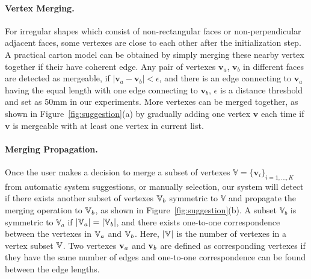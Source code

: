 \paragraph{Vertex Merging.} 
For irregular shapes which consist of non-rectangular faces or non-perpendicular adjacent faces, some vertexes are close to each other after the initialization step.
A practical carton model can be obtained by simply merging these nearby vertex together if their have coherent edge.
%
Any pair of vertexes $\mathbf{v}_a$, $\mathbf{v}_b$ in different faces are detected as mergeable, if $|\mathbf{v}_a-\mathbf{v}_b|<\epsilon$, and there is an edge connecting to $\mathbf{v}_a$ having the equal length with one edge connecting to $\mathbf{v}_b$,
%
$\epsilon$ is a distance threshold and set as 50mm in our experiments.
More vertexes can be merged together, as shown in Figure~\ref{fig:suggestion}(a) by gradually adding one vertex $\mathbf{v}$ each time if $\mathbf{v}$ is mergeable with at least one vertex in current list. 

\paragraph{Merging Propagation.} %
Once the user makes a decision to merge a subset of vertexes $\mathbb{V}=\{\mathbf{v}_i\}_{i=1,\ldots,K}$ from automatic system suggestions, or manually selection, our system will detect if there exists another subset of vertexes $\mathbb{V}_b$ symmetric to $\mathbb{V}$ and propagate the merging operation to $\mathbb{V}_b$, as shown in Figure~\ref{fig:suggestion}(b). 
A subset $\mathbb{V}_b$ is symmetric to $\mathbb{V}_a$ if $|\mathbb{V}_a|=|\mathbb{V}_b|$, and there exists one-to-one correspondence between the vertexes in $\mathbb{V}_a$ and $\mathbb{V}_b$. 
Here, $|\mathbb{V}|$ is the number of vertexes in a vertex subset $\mathbb{V}$. 
Two vertexes $\mathbf{v}_a$ and $\mathbf{v}_b$ are defined as corresponding vertexes if they have the same number of edges and one-to-one correspondence can be found between the edge lengths. 

